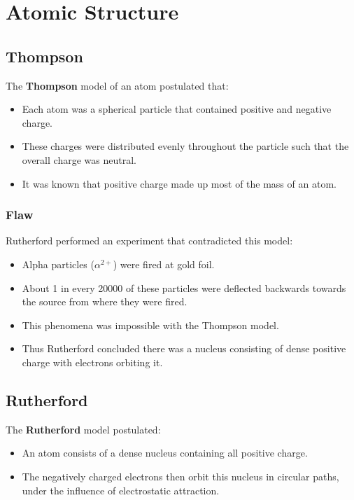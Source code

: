 \documentclass[a4paper,11pt]{report}
\begin{document}
\chapter{Atomic Structure}

\section{Thompson}

The \textbf{Thompson} model of an atom postulated that:

\begin{itemize}
\item Each atom was a spherical particle that contained positive and negative
	charge.
\item These charges were distributed evenly throughout the particle such that
	the overall charge was neutral.
\item It was known that positive charge made up most of the mass of an atom.
\end{itemize}

\subsection{Flaw}

Rutherford performed an experiment that contradicted this model:

\begin{itemize}
\item Alpha particles ($\alpha^{2+}$) were fired at gold foil.
\item About 1 in every 20000 of these particles were deflected backwards
	towards the source from where they were fired.
\item This phenomena was impossible with the Thompson model.
\item Thus Rutherford concluded there was a nucleus consisting of dense positive
	charge with electrons orbiting it.
\end{itemize}


\section{Rutherford}

The \textbf{Rutherford} model postulated:

\begin{itemize}
\item An atom consists of a dense nucleus containing all positive charge.
\item The negatively charged electrons then orbit this nucleus in circular
	paths, under the influence of electrostatic attraction.
\end{itemize}
\end{document}
